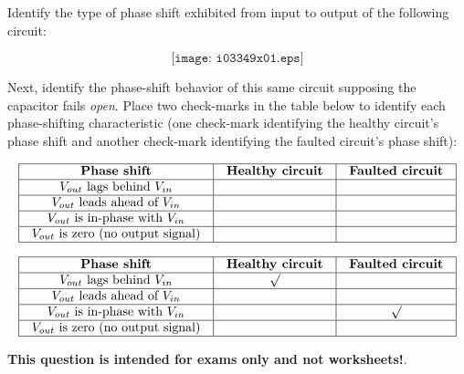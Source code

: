 

Identify the type of phase shift exhibited from input to output of the following circuit:

$$\texttt{[image: i03349x01.eps]}$$

Next, identify the phase-shift behavior of this same circuit supposing the capacitor fails {\it open}.  Place two check-marks in the table below to identify each phase-shifting characteristic (one check-mark identifying the healthy circuit's phase shift and another check-mark identifying the faulted circuit's phase shift):


$$\vbox{\offinterlineskip
\halign{\strut
\vrule \quad\hfil # \ \hfil & 
\vrule \quad\hfil # \ \hfil & 
\vrule \quad\hfil # \ \hfil \vrule \cr
\noalign{\hrule}
%
{\bf Phase shift} & {\bf Healthy circuit} & {\bf Faulted circuit} \cr
%
\noalign{\hrule}
%
$V_{out}$ lags behind $V_{in}$ &  &  \cr
%
\noalign{\hrule}
%
$V_{out}$ leads ahead of $V_{in}$ &  &  \cr
%
\noalign{\hrule}
%
$V_{out}$ is in-phase with $V_{in}$ &  &  \cr
%
\noalign{\hrule}
%
$V_{out}$ is zero (no output signal) &  &  \cr
%
\noalign{\hrule}
} %
}$$ %








$$\vbox{\offinterlineskip
\halign{\strut
\vrule \quad\hfil # \ \hfil & 
\vrule \quad\hfil # \ \hfil & 
\vrule \quad\hfil # \ \hfil \vrule \cr
\noalign{\hrule}
%
{\bf Phase shift} & {\bf Healthy circuit} & {\bf Faulted circuit} \cr
%
\noalign{\hrule}
%
$V_{out}$ lags behind $V_{in}$ & $\surd$ &  \cr
%
\noalign{\hrule}
%
$V_{out}$ leads ahead of $V_{in}$ &  &  \cr
%
\noalign{\hrule}
%
$V_{out}$ is in-phase with $V_{in}$ &  & $\surd$ \cr
%
\noalign{\hrule}
%
$V_{out}$ is zero (no output signal) &  &  \cr
%
\noalign{\hrule}
} %
}$$ %








{\bf This question is intended for exams only and not worksheets!}.



